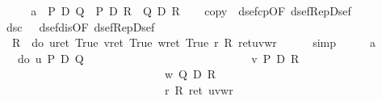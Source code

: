 \begin{isabellebody}
\isamarkupfalse%
\ {\isacharminus}\isanewline
\ \ \isamarkupfalse%
\ a{}{\isacharcolon}\ {\isachardoublequote}{\isasymturnstile}\ P\ {\isasymor}\isactrlsub D\ Q{\isachardoublequote}\ {\isachardoublequote}{\isasymturnstile}\ P\ {\isasymlongrightarrow}\isactrlsub D\ R{\isachardoublequote}\ {\isachardoublequote}{\isasymturnstile}\ Q\ {\isasymlongrightarrow}\isactrlsub D\ R{\isachardoublequote}\isanewline
\ \ \isamarkupfalse%
\ copy\ {\isacharequal}\ dsef{\isacharunderscore}cp{\isacharbrackleft}OF\ dsef{\isacharunderscore}Rep{\isacharunderscore}Dsef{\isacharbrackright}\isanewline
\ \ \isamarkupfalse%
\ dsc\ \ {\isacharequal}\ dsef{\isacharunderscore}dis{\isacharbrackleft}OF\ dsef{\isacharunderscore}Rep{\isacharunderscore}Dsef{\isacharbrackright}\isanewline
\ \ %
\isanewline
\ \ \isamarkupfalse%
\ {\isachardoublequote}{\isasymDown}\ R\ {\isacharequal}\ do\ {\isacharbraceleft}u{\isasymleftarrow}ret\ True{\isacharsemicolon}\ v{\isasymleftarrow}ret\ True{\isacharsemicolon}\ w{\isasymleftarrow}ret\ True{\isacharsemicolon}\ r{\isasymleftarrow}{\isasymDown}\ R{\isacharsemicolon}\ ret{\isacharparenleft}u{\isasymlongrightarrow}v{\isasymlongrightarrow}w{\isasymlongrightarrow}r{\isacharparenright}{\isacharbraceright}{\isachardoublequote}\isanewline
\ \ \ \ \isamarkupfalse%
\ simp\isanewline
\ \ \isamarkupfalse%
\ \isamarkupfalse%
\ a{}\ \isamarkupfalse%
\ {\isachardoublequote}{\isasymdots}\ {\isacharequal}\ do\ {\isacharbraceleft}u{\isasymleftarrow}{\isacharparenleft}{\isasymDown}\ {\isacharparenleft}P\ {\isasymor}\isactrlsub D\ Q{\isacharparenright}{\isacharparenright}{\isacharsemicolon}\isanewline
\ \ \ \ \ \ \ \ \ \ \ \ \ \ \ \ \ \ \ \ \ \ \ \ \ \ \ \ \ v{\isasymleftarrow}{\isacharparenleft}{\isasymDown}\ {\isacharparenleft}P\ {\isasymlongrightarrow}\isactrlsub D\ R{\isacharparenright}{\isacharparenright}{\isacharsemicolon}\isanewline
\ \ \ \ \ \ \ \ \ \ \ \ \ \ \ \ \ \ \ \ \ \ \ \ \ \ \ \ \ w{\isasymleftarrow}{\isacharparenleft}{\isasymDown}\ {\isacharparenleft}Q\ {\isasymlongrightarrow}\isactrlsub D\ R{\isacharparenright}{\isacharparenright}{\isacharsemicolon}\isanewline
\ \ \ \ \ \ \ \ \ \ \ \ \ \ \ \ \ \ \ \ \ \ \ \ \ \ \ \ \ r{\isasymleftarrow}{\isasymDown}\ R{\isacharsemicolon}\ ret\ {\isacharparenleft}u{\isasymlongrightarrow}v{\isasymlongrightarrow}w{\isasymlongrightarrow}r{\isacharparenright}{\isacharbraceright}{\isachardoublequote}\isanewline

\end{isabellebody}
